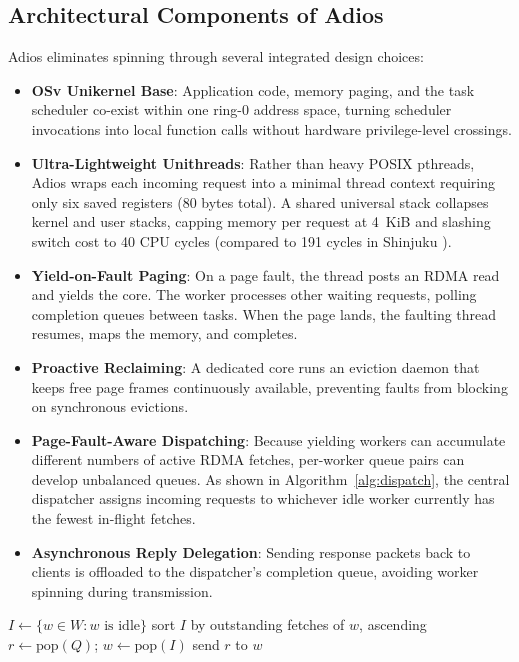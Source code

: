 \subsection{Architectural Components of Adios}
Adios eliminates spinning through several integrated design choices:
\begin{itemize}
\item \textbf{OSv Unikernel Base}: Application code, memory paging, and the task scheduler co-exist within one ring-0 address space, turning scheduler invocations into local function calls without hardware privilege-level crossings.
\item \textbf{Ultra-Lightweight Unithreads}: Rather than heavy POSIX pthreads, Adios wraps each incoming request into a minimal thread context requiring only six saved registers (80 bytes total). A shared universal stack collapses kernel and user stacks, capping memory per request at 4~KiB and slashing switch cost to 40 CPU cycles (compared to 191 cycles in Shinjuku \cite{shinjuku}).
\item \textbf{Yield-on-Fault Paging}: On a page fault, the thread posts an RDMA read and yields the core. The worker processes other waiting requests, polling completion queues between tasks. When the page lands, the faulting thread resumes, maps the memory, and completes.
\item \textbf{Proactive Reclaiming}: A dedicated core runs an eviction daemon that keeps free page frames continuously available, preventing faults from blocking on synchronous evictions.
\item \textbf{Page-Fault-Aware Dispatching}: Because yielding workers can accumulate different numbers of active RDMA fetches, per-worker queue pairs can develop unbalanced queues. As shown in Algorithm~\ref{alg:dispatch}, the central dispatcher assigns incoming requests to whichever idle worker currently has the fewest in-flight fetches.
\item \textbf{Asynchronous Reply Delegation}: Sending response packets back to clients is offloaded to the dispatcher's completion queue, avoiding worker spinning during transmission.
\end{itemize}

\begin{algorithm}[t]
\caption{Page-fault-aware dispatching (our rendering of the policy in \cite{adios}).}
\label{alg:dispatch}
\begin{algorithmic}[1]
\small
{}
\State $I \gets \{w \in W : w \text{ is idle}\}$
\State sort $I$ by outstanding fetches of $w$, ascending
  \State $r \gets \text{pop}(Q)$;\; $w \gets \text{pop}(I)$
  \State send $r$ to $w$
\EndWhile
\EndProcedure
\end{algorithmic}
\end{algorithm}

